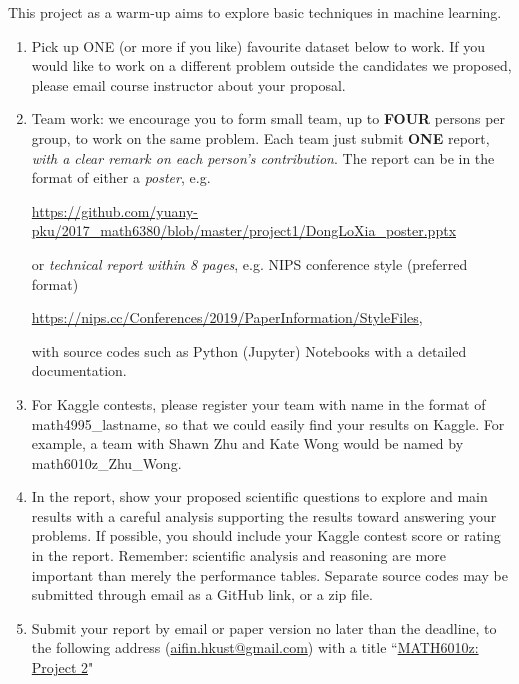 \documentclass[11pt]{article}
\begin{document}
This project as a warm-up aims to explore basic techniques in machine learning.
\begin{enumerate}
\item Pick up ONE (or more if you like) favourite dataset below to work. If you would like to work on a different problem outside the candidates we proposed, please email course instructor about your proposal.  
\item Team work: we encourage you to form small team, up to {\bf FOUR} persons per group, to work on the same problem. Each team just submit {\bf ONE} report, \emph{with a clear remark on each person's contribution}. The report can be in the format of either a \emph{poster}, e.g. 
\begin{center}%
\url{https://github.com/yuany-pku/2017_math6380/blob/master/project1/DongLoXia_poster.pptx}
\end{center}
or \emph{technical report within 8 pages}, e.g. NIPS conference style (preferred format) 
\begin{center}
\url{https://nips.cc/Conferences/2019/PaperInformation/StyleFiles}, 
\end{center}
with source codes such as Python (Jupyter) Notebooks with a detailed documentation.
\item For Kaggle contests, please register your team with name in the format of math4995\_lastname, so that we could easily find your results on Kaggle. For example, a team with Shawn Zhu and Kate Wong would be named by math6010z\_Zhu\_Wong.

\item In the report, show your proposed scientific questions to explore and main results with a careful analysis supporting the results toward answering your problems. If possible, you should include your Kaggle contest score or rating in the report. Remember: scientific analysis and reasoning are more important than merely the performance tables. Separate source codes may be submitted through email as a GitHub link, or a zip file.    
\item Submit your report by email or paper version no later than the deadline, to the following address  (\href{mailto:aifin.hkust@gmail.com}{aifin.hkust@gmail.com}) with a title ``\underline{MATH6010z: Project 2}" %


\end{enumerate}
\end{document}
